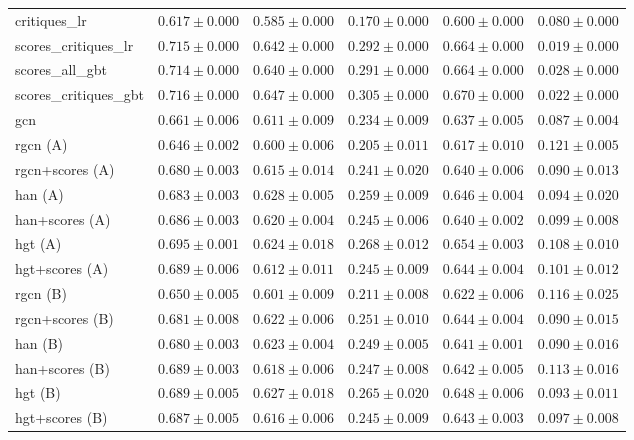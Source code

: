 \begin{table}[t]
\begin{tabular}{lccccc}
critiques\_lr & $0.617 \pm 0.000$ & $0.585 \pm 0.000$ & $0.170 \pm 0.000$ & $0.600 \pm 0.000$ & $0.080 \pm 0.000$ \\
scores\_critiques\_lr & $0.715 \pm 0.000$ & $0.642 \pm 0.000$ & $0.292 \pm 0.000$ & $0.664 \pm 0.000$ & $0.019 \pm 0.000$ \\
scores\_all\_gbt & $0.714 \pm 0.000$ & $0.640 \pm 0.000$ & $0.291 \pm 0.000$ & $0.664 \pm 0.000$ & $0.028 \pm 0.000$ \\
scores\_critiques\_gbt & $0.716 \pm 0.000$ & $0.647 \pm 0.000$ & $0.305 \pm 0.000$ & $0.670 \pm 0.000$ & $0.022 \pm 0.000$ \\
gcn & $0.661 \pm 0.006$ & $0.611 \pm 0.009$ & $0.234 \pm 0.009$ & $0.637 \pm 0.005$ & $0.087 \pm 0.004$ \\
rgcn (A) & $0.646 \pm 0.002$ & $0.600 \pm 0.006$ & $0.205 \pm 0.011$ & $0.617 \pm 0.010$ & $0.121 \pm 0.005$ \\
rgcn+scores (A) & $0.680 \pm 0.003$ & $0.615 \pm 0.014$ & $0.241 \pm 0.020$ & $0.640 \pm 0.006$ & $0.090 \pm 0.013$ \\
han (A) & $0.683 \pm 0.003$ & $0.628 \pm 0.005$ & $0.259 \pm 0.009$ & $0.646 \pm 0.004$ & $0.094 \pm 0.020$ \\
han+scores (A) & $0.686 \pm 0.003$ & $0.620 \pm 0.004$ & $0.245 \pm 0.006$ & $0.640 \pm 0.002$ & $0.099 \pm 0.008$ \\
hgt (A) & $0.695 \pm 0.001$ & $0.624 \pm 0.018$ & $0.268 \pm 0.012$ & $0.654 \pm 0.003$ & $0.108 \pm 0.010$ \\
hgt+scores (A) & $0.689 \pm 0.006$ & $0.612 \pm 0.011$ & $0.245 \pm 0.009$ & $0.644 \pm 0.004$ & $0.101 \pm 0.012$ \\
rgcn (B) & $0.650 \pm 0.005$ & $0.601 \pm 0.009$ & $0.211 \pm 0.008$ & $0.622 \pm 0.006$ & $0.116 \pm 0.025$ \\
rgcn+scores (B) & $0.681 \pm 0.008$ & $0.622 \pm 0.006$ & $0.251 \pm 0.010$ & $0.644 \pm 0.004$ & $0.090 \pm 0.015$ \\
han (B) & $0.680 \pm 0.003$ & $0.623 \pm 0.004$ & $0.249 \pm 0.005$ & $0.641 \pm 0.001$ & $0.090 \pm 0.016$ \\
han+scores (B) & $0.689 \pm 0.003$ & $0.618 \pm 0.006$ & $0.247 \pm 0.008$ & $0.642 \pm 0.005$ & $0.113 \pm 0.016$ \\
hgt (B) & $0.689 \pm 0.005$ & $0.627 \pm 0.018$ & $0.265 \pm 0.020$ & $0.648 \pm 0.006$ & $0.093 \pm 0.011$ \\
hgt+scores (B) & $0.687 \pm 0.005$ & $0.616 \pm 0.006$ & $0.245 \pm 0.009$ & $0.643 \pm 0.003$ & $0.097 \pm 0.008$ \\
\bottomrule
\end{tabular}
\end{table}
